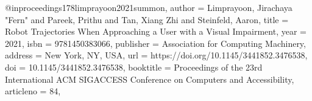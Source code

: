 @inproceedings{178limprayoon2021summon,
author = {Limprayoon, Jirachaya "Fern" and Pareek, Prithu and Tan, Xiang Zhi and Steinfeld, Aaron},
title = {Robot Trajectories When Approaching a User with a Visual Impairment},
year = {2021},
isbn = {9781450383066},
publisher = {Association for Computing Machinery},
address = {New York, NY, USA},
url = {https://doi.org/10.1145/3441852.3476538},
doi = {10.1145/3441852.3476538},
booktitle = {Proceedings of the 23rd International ACM SIGACCESS Conference on Computers and Accessibility},
articleno = {84},
}
